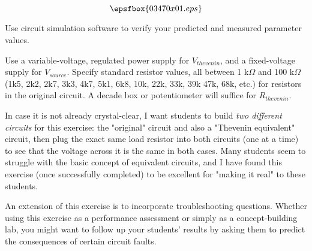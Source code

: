 

$$\epsfbox{03470x01.eps}$$

\vfil \eject






Use circuit simulation software to verify your predicted and measured parameter values.







Use a variable-voltage, regulated power supply for $V_{thevenin}$, and a fixed-voltage supply for $V_{source}$.  Specify standard resistor values, all between 1 k$\Omega$ and 100 k$\Omega$ (1k5, 2k2, 2k7, 3k3, 4k7, 5k1, 6k8, 10k, 22k, 33k, 39k 47k, 68k, etc.) for resistors in the original circuit.  A decade box or potentiometer will suffice for $R_{thevenin}$.

In case it is not already crystal-clear, I want students to build {\it two different circuits} for this exercise: the "original" circuit and also a "Thevenin equivalent" circuit, then plug the exact same load resistor into both circuits (one at a time) to see that the voltage across it is the same in both cases.  Many students seem to struggle with the basic concept of equivalent circuits, and I have found this exercise (once successfully completed) to be excellent for "making it real" to these students.

An extension of this exercise is to incorporate troubleshooting questions.  Whether using this exercise as a performance assessment or simply as a concept-building lab, you might want to follow up your students' results by asking them to predict the consequences of certain circuit faults.





